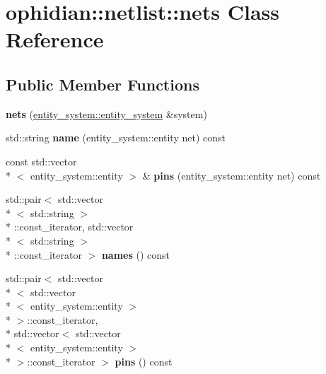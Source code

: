 \hypertarget{classophidian_1_1netlist_1_1nets}{\section{ophidian\-:\-:netlist\-:\-:nets Class Reference}
\label{classophidian_1_1netlist_1_1nets}
}
\subsection*{Public Member Functions}
\begin{DoxyCompactItemize}
\item 
\hypertarget{classophidian_1_1netlist_1_1nets_a2a6044f1fdbd945f0fe81fe18a69d2f0}{{\bfseries nets} (\hyperlink{classophidian_1_1entity__system_1_1entity__system}{entity\-\_\-system\-::entity\-\_\-system} \&system)}\label{classophidian_1_1netlist_1_1nets_a2a6044f1fdbd945f0fe81fe18a69d2f0}

\item 
\hypertarget{classophidian_1_1netlist_1_1nets_a3dcfc37a15aa29046e9593dae7e2b72f}{std\-::string {\bfseries name} (entity\-\_\-system\-::entity net) const }\label{classophidian_1_1netlist_1_1nets_a3dcfc37a15aa29046e9593dae7e2b72f}

\item 
\hypertarget{classophidian_1_1netlist_1_1nets_a821b53430d9dc921897fb7ae2504c235}{const std\-::vector\\*
$<$ entity\-\_\-system\-::entity $>$ \& {\bfseries pins} (entity\-\_\-system\-::entity net) const }\label{classophidian_1_1netlist_1_1nets_a821b53430d9dc921897fb7ae2504c235}

\item 
\hypertarget{classophidian_1_1netlist_1_1nets_ae9cfc72e8f37515d27f76ba3f213bc15}{std\-::pair$<$ std\-::vector\\*
$<$ std\-::string $>$\\*
\-::const\-\_\-iterator, std\-::vector\\*
$<$ std\-::string $>$\\*
\-::const\-\_\-iterator $>$ {\bfseries names} () const }\label{classophidian_1_1netlist_1_1nets_ae9cfc72e8f37515d27f76ba3f213bc15}

\item 
\hypertarget{classophidian_1_1netlist_1_1nets_a94427d262a255ed26b4bb6c15bdcfb3e}{std\-::pair$<$ std\-::vector\\*
$<$ std\-::vector\\*
$<$ entity\-\_\-system\-::entity $>$\\*
 $>$\-::const\-\_\-iterator, \\*
std\-::vector$<$ std\-::vector\\*
$<$ entity\-\_\-system\-::entity $>$\\*
 $>$\-::const\-\_\-iterator $>$ {\bfseries pins} () const }\label{classophidian_1_1netlist_1_1nets_a94427d262a255ed26b4bb6c15bdcfb3e}


\end{DoxyCompactItemize}
